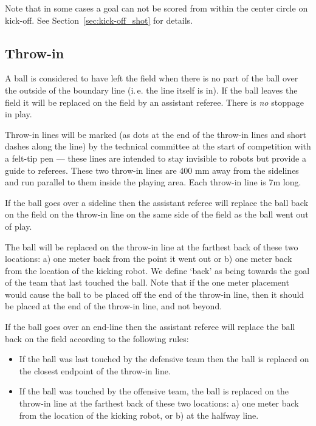 \documentclass[12pt]{article}
\newcommand{\ie}{\mbox{i.\,e.}\xspace}
\begin{document}
Note that in some cases a goal can not be scored from within the center circle on kick-off. See Section~\ref{sec:kick-off_shot} for details.

\subsection{Throw-in}
\label{sec:throw_in}

A ball is considered to have left the field when there is no part of the ball over the outside of the boundary line (\ie the line itself is in). If the ball leaves the field it will be replaced on the field by an assistant referee. There is \emph{no} stoppage in play.

Throw-in lines will be marked (as dots at the end of the throw-in lines and short dashes along the line) by the technical committee at the start of competition with a felt-tip pen --- these lines are intended to stay invisible to robots but provide a guide to referees.  These two throw-in lines are 400 mm away from the sidelines and run parallel to them inside the playing area.  Each throw-in line is 7m long.

If the ball goes over a sideline then the assistant referee will replace the ball back on the field on the throw-in line on the same side of the field as the ball went out of play.

The ball will be replaced on the throw-in line at the farthest back of these two locations: a) one meter back from the point it went out or b) one meter back from the location of the kicking robot. We define `back' as being towards the goal of the team that last touched the ball. Note that if the one meter placement would cause the ball to be placed off the end of the throw-in line, then it should be placed at the end of the throw-in line, and not beyond.

If the ball goes over an end-line then the assistant referee will replace the ball back on the field according to the following rules:

\begin{itemize}

\item If the ball was last touched by the defensive team then the ball is replaced on the closest endpoint of the throw-in line.

\item If the ball was touched by the offensive team, the ball is replaced on
the throw-in line at the farthest back of these two locations: a) one
meter back from the location of the kicking robot, or b) at the halfway
line.

\end{itemize}
\end{document}
